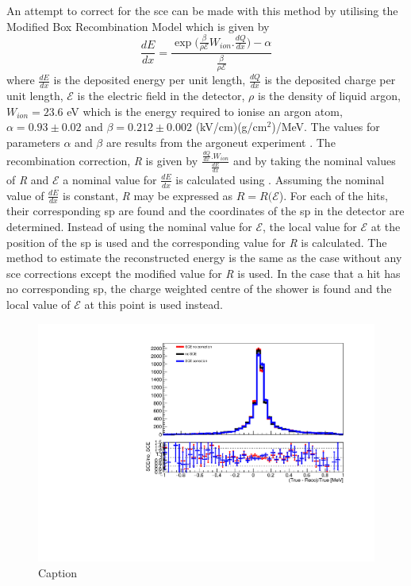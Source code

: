 An attempt to correct for the \Gls{sce} can be made with this method by utilising the Modified Box Recombination Model which is given by \begin{equation}\label{eqn:ModBox}
    \frac{dE}{dx} = \frac{\exp{(\frac{\beta}{\rho \mathcal{E}} W_{ion}.\frac{dQ}{dx}}) - \alpha}{\frac{\beta}{\rho \mathcal{E}}}
\end{equation}
where $\frac{dE}{dx}$ is the deposited energy per unit length, $\frac{dQ}{dx}$ is the deposited charge per unit length,  $\mathcal{E}$ is the electric field in the detector, $\rho$ is the density of liquid argon, $W_{ion} = 23.6$ eV which is the energy required to ionise an argon atom, $\alpha = 0.93 \pm 0.02$ and $\beta = 0.212 \pm 0.002$ (kV/cm)(g/cm$^2$)/MeV. The values for parameters $\alpha$ and $\beta$ are results from the \Gls{argoneut} experiment \cite{ArgoNeuT_recombination_paper}. The recombination correction, \textit{R} is given by $\frac{\frac{dQ}{dx}.W_{ion}}{\frac{dE}{dx}}$ and by taking the nominal values of \textit{R} and $\mathcal{E}$ a nominal value for $\frac{dE}{dx}$ is calculated using . Assuming the nominal value of $\frac{dE}{dx}$ is constant, \textit{R} may be expressed as $R = R(\mathcal{E}$). For each of the hits, their corresponding \Gls{sp} are found and the coordinates of the \Gls{sp} in the detector are determined. Instead of using the nominal value for $\mathcal{E}$, the local value for $\mathcal{E}$ at the position of the \Gls{sp} is used and the corresponding value for \textit{R} is calculated. The method to estimate the reconstructed energy is the same as the case without any \Gls{sce} corrections except the modified value for \textit{R} is used. In the case that a hit has no corresponding \Gls{sp}, the charge weighted centre of the shower is found and the local value of $\mathcal{E}$ at this point is used instead.

\begin{figure}[h]
    \centering
    \includegraphics[width = \largefigwidth]{figures-chap4/ratio_plot_oldmethod_trueshoweringparticle.pdf}
    \caption{Caption}
    \label{fig:my_label}
\end{figure}



